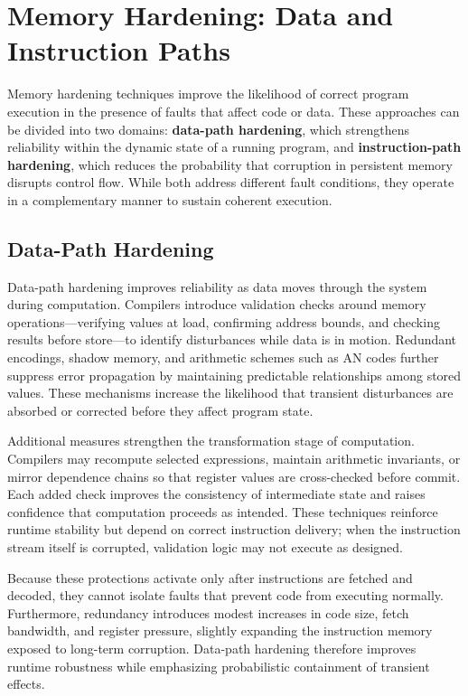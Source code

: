 \section{Memory Hardening: Data and Instruction Paths}

Memory hardening techniques improve the likelihood of correct program execution in the presence of faults that affect code or data. These approaches can be divided into two domains: \textbf{data-path hardening}, which strengthens reliability within the dynamic state of a running program, and \textbf{instruction-path hardening}, which reduces the probability that corruption in persistent memory disrupts control flow. While both address different fault conditions, they operate in a complementary manner to sustain coherent execution.

\subsection{Data-Path Hardening}

Data-path hardening improves reliability as data moves through the system during computation. Compilers introduce validation checks around memory operations—verifying values at load, confirming address bounds, and checking results before store—to identify disturbances while data is in motion. Redundant encodings, shadow memory, and arithmetic schemes such as AN codes further suppress error propagation by maintaining predictable relationships among stored values. These mechanisms increase the likelihood that transient disturbances are absorbed or corrected before they affect program state.

Additional measures strengthen the transformation stage of computation. Compilers may recompute selected expressions, maintain arithmetic invariants, or mirror dependence chains so that register values are cross-checked before commit. Each added check improves the consistency of intermediate state and raises confidence that computation proceeds as intended. These techniques reinforce runtime stability but depend on correct instruction delivery; when the instruction stream itself is corrupted, validation logic may not execute as designed.

Because these protections activate only after instructions are fetched and decoded, they cannot isolate faults that prevent code from executing normally. Furthermore, redundancy introduces modest increases in code size, fetch bandwidth, and register pressure, slightly expanding the instruction memory exposed to long-term corruption. Data-path hardening therefore improves runtime robustness while emphasizing probabilistic containment of transient effects.

